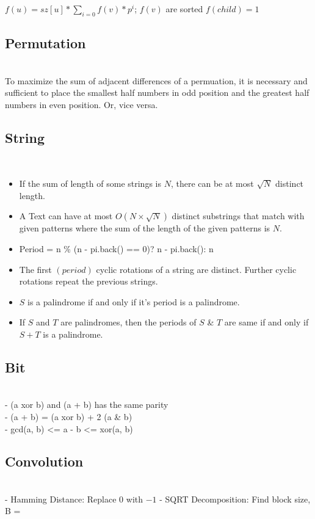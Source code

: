 \( f(u) = sz[u] * \sum_{i = 0} f(v) * p^{i} \);    \( f(v) \) are sorted \)
\( f(child) = 1 \)

\subsection{Permutation} \\
To maximize the sum of adjacent differences of a permuation, it is necessary and sufficient to place the smallest half numbers in odd position and the greatest half numbers in even position. Or, vice versa.

\subsection{String} \\

\begin{itemize}
  \item If the sum of length of some strings is \( N \), there can be at most \( \sqrt{N} \) distinct length. \\
  \item A Text can have at most \( O(N \times \sqrt{N}) \) distinct substrings that match with given patterns where the sum of the length of the given patterns is \( N \). \\
  \item Period =  n \% (n - pi.back() == 0)? n - pi.back(): n \\
  \item The first \( (period) \) cyclic rotations of a string are distinct. Further cyclic rotations repeat the previous strings. \\
  \item \( S \) is a palindrome if and only if it's period is a palindrome. \\
  \item If $S$ and $T$ are palindromes, then the periods of $S$ & $T$ are same if and only if $S + T$ is a palindrome.
\end{itemize}

\subsection{Bit} \\
- (a xor b) and (a + b) has the same parity \\
- (a + b) = (a xor b) + 2 (a & b) \\
- gcd(a, b) <= a - b <= xor(a, b) \\

\subsection{Convolution} \\
- Hamming Distance: Replace \( 0 \) with \( -1 \)
- SQRT Decomposition: Find block size, B = 
